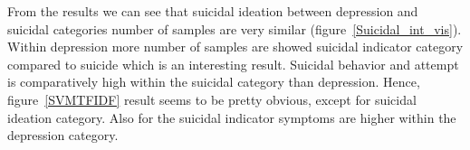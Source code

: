 \documentclass[sn-mathphys,Numbered]{sn-jnl}%
\theoremstyle{thmstyleone}%
\theoremstyle{thmstyletwo}%
\theoremstyle{thmstylethree}%
\begin{document}
From the results we can see that suicidal ideation between depression and suicidal categories number of samples are very similar (figure~\ref{Suicidal_int_vis}). Within depression more number of samples are showed suicidal indicator category compared to suicide which is an interesting result. Suicidal behavior and attempt is comparatively high within the suicidal category than depression. Hence, figure~\ref{SVMTFIDF} result seems to be pretty obvious, except for suicidal ideation category. Also for the suicidal indicator symptoms are higher within the depression category. 
\end{document}
